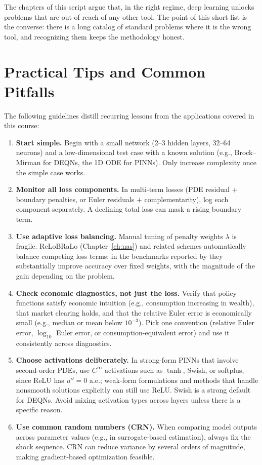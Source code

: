 \documentclass[11pt,a4paper]{report}
\begin{document}
The chapters of this script argue that, in the right regime, deep learning unlocks problems that are out of reach of any other tool.  The point of this short list is the converse: there is a long catalog of standard problems where it is the wrong tool, and recognizing them keeps the methodology honest.

\section{Practical Tips and Common Pitfalls}

The following guidelines distill recurring lessons from the applications covered in this course:

\begin{enumerate}[itemsep=4pt]
\item \textbf{Start simple.}  Begin with a small network (2--3 hidden layers, 32--64 neurons) and a low-dimensional test case with a known solution (e.g., Brock--Mirman for DEQNs, the 1D ODE for PINNs).  Only increase complexity once the simple case works.

\item \textbf{Monitor all loss components.}  In multi-term losses (PDE residual $+$ boundary penalties, or Euler residuals $+$ complementarity), log each component separately.  A declining total loss can mask a rising boundary term.

\item \textbf{Use adaptive loss balancing.}  Manual tuning of penalty weights $\lambda$ is fragile.  ReLoBRaLo (Chapter~\ref{ch:nas}) and related schemes automatically balance competing loss terms; in the benchmarks reported by \citet{bischof2025relobralo} they substantially improve accuracy over fixed weights, with the magnitude of the gain depending on the problem.

\item \textbf{Check economic diagnostics, not just the loss.}  Verify that policy functions satisfy economic intuition (e.g., consumption increasing in wealth), that market clearing holds, and that the relative Euler error is economically small (e.g., median or mean below $10^{-3}$).  Pick one convention (relative Euler error, $\log_{10}$ Euler error, or consumption-equivalent error) and use it consistently across diagnostics.

\item \textbf{Choose activations deliberately.}  In strong-form PINNs that involve second-order PDEs, use $C^\infty$ activations such as $\tanh$, Swish, or softplus, since ReLU has $u'' = 0$ a.e.; weak-form formulations and methods that handle nonsmooth solutions explicitly can still use ReLU.  Swish is a strong default for DEQNs.  Avoid mixing activation types across layers unless there is a specific reason.

\item \textbf{Use common random numbers (CRN).}  When comparing model outputs across parameter values (e.g., in surrogate-based estimation), always fix the shock sequence.  CRN can reduce variance by several orders of magnitude, making gradient-based optimization feasible.
\end{enumerate}
\end{document}

